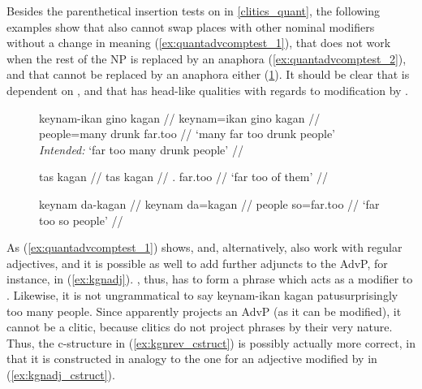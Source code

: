 Besides the parenthetical insertion tests on  in
\autoref{clitics_quant}, the following examples show that 
also cannot swap places with other nominal modifiers without a change in
meaning (\ref{ex:quantadvcomptest_1}), that  does not work
when the rest of the NP is replaced by an anaphora
(\ref{ex:quantadvcomptest_2}), and that  cannot be replaced
by an anaphora either (\ref{ex:quantadvcomptest_3}). It should be
clear that  is dependent on , and that 
 has head-like qualities with regards to modification by
.

\begin{figure}
\pex\label{ex:quantadvcomptest}
\a\ljudge\excl\label{ex:quantadvcomptest_1}\begingl
	\gla keynam-ikan gino kagan //
	\glb keynam=ikan gino kagan //
	\glc people=many drunk far.too //
	\glft `many far too drunk people'\\
		\textit{Intended:} `far too many drunk people' //
\endgl

\a\ljudge*\label{ex:quantadvcomptest_2}\begingl
	\gla tas kagan //
	\glb tas kagan //
	\glc \TplM{}.\Parg{} far.too //
	\glft `far too of them' //
\endgl

\a\ljudge*\label{ex:quantadvcomptest_3}\begingl
	\gla keynam da-kagan //
	\glb keynam da=kagan //
	\glc people so=far.too //
	\glft `far too so people' //
\endgl

\xe
\end{figure}

As (\ref{ex:quantadvcomptest_1}) shows,  and, alternatively,
 also work with regular adjectives, and it is possible as
well to add further adjuncts to the AdvP, for instance,
 in (\ref{ex:kgnadj}). , thus, has to form a phrase which acts as a modifier to
. Likewise, it is not ungrammatical to say
 {keynam-ikan kagan patu}{surprisingly too many
people}. Since  apparently projects an AdvP (as it can be
modified), it cannot be a clitic, because clitics do not project phrases by
their very nature. Thus, the c-structure in (\ref{ex:kgnrev_cstruct}) is
possibly actually more correct, in that it is constructed in analogy to the one
for an adjective modified by
 in (\ref{ex:kgnadj_cstruct}).

